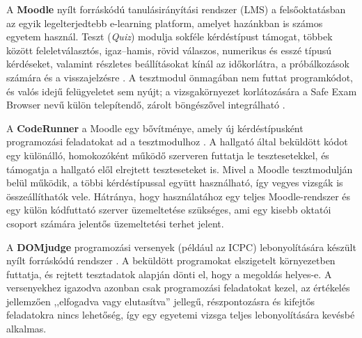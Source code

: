 A \textbf{Moodle} nyílt forráskódú tanulásirányítási rendszer (LMS) a felsőoktatásban az egyik
legelterjedtebb e-learning platform, amelyet hazánkban is számos egyetem használ. Teszt (\textit{Quiz})
modulja sokféle kérdéstípust támogat, többek között feleletválasztós, igaz--hamis, rövid
válaszos, numerikus és esszé típusú kérdéseket, valamint részletes beállításokat kínál az
időkorlátra, a próbálkozások számára és a visszajelzésre \cite{moodle_quiz_docs}. A tesztmodul
önmagában nem futtat programkódot, és valós idejű felügyeletet sem nyújt; a vizsgakörnyezet
korlátozására a Safe Exam Browser nevű külön telepítendő, zárolt böngészővel integrálható
\cite{seb_site}.

A \textbf{CodeRunner} a Moodle egy bővítménye, amely új kérdéstípusként programozási feladatokat
ad a tesztmodulhoz \cite{coderunner_site}. A hallgató által beküldött kódot egy különálló,
homokozóként működő szerveren futtatja le tesztesetekkel, és támogatja a hallgató elől elrejtett
teszteseteket is. Mivel a Moodle tesztmodulján belül működik, a többi kérdéstípussal együtt
használható, így vegyes vizsgák is összeállíthatók vele. Hátránya, hogy használatához egy teljes
Moodle-rendszer és egy külön kódfuttató szerver üzemeltetése szükséges, ami egy kisebb oktatói
csoport számára jelentős üzemeltetési terhet jelent.

A \textbf{DOMjudge} programozási versenyek (például az ICPC) lebonyolítására készült nyílt
forráskódú rendszer \cite{domjudge_site}. A beküldött programokat elszigetelt környezetben futtatja,
és rejtett tesztadatok alapján dönti el, hogy a megoldás helyes-e. A versenyekhez igazodva
azonban csak programozási feladatokat kezel, az értékelés jellemzően ,,elfogadva vagy elutasítva''
jellegű, részpontozásra és kifejtős feladatokra nincs lehetőség, így egy egyetemi vizsga teljes
lebonyolítására kevésbé alkalmas.


